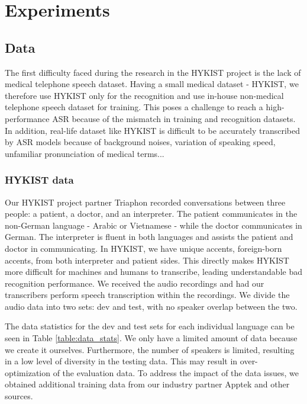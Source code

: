 \chapter{Experiments}
\label{ch: Experiments}


\section{Data}

The first difficulty faced during the research in the HYKIST project is the lack of medical telephone speech dataset.
Having a small medical dataset - HYKIST, we therefore use HYKIST only for the recognition and use in-house non-medical telephone speech dataset for training. 
This poses a challenge to reach a high-performance ASR because of the mismatch in training and recognition datasets.
In addition, real-life dataset like HYKIST is difficult to be accurately transcribed by ASR models because of background noises, variation of speaking speed, unfamiliar pronunciation of medical terms...


\subsection{HYKIST data}

Our HYKIST project partner Triaphon recorded conversations between three people: a patient, a doctor, and an interpreter. 
The patient communicates in the non-German language - Arabic or Vietnamese - while the doctor communicates in German. 
The interpreter is fluent in both languages and assists the patient and doctor in communicating. 
In HYKIST, we have unique accents, foreign-born accents, from both interpreter and patient sides.
This directly makes HYKIST more difficult for machines and humans to transcribe, leading understandable bad recognition performance.
We received the audio recordings and had our transcribers perform speech transcription within the recordings. 
We divide the audio data into two sets: dev and test, with no speaker overlap between the two.

The data statistics for the dev and test sets for each individual language can be seen in Table \ref{table:data_stats}.
We only have a limited amount of data because we create it ourselves.
Furthermore, the number of speakers is limited, resulting in a low level of diversity in the testing data.
This may result in over-optimization of the evaluation data.
To address the impact of the data issues, we obtained additional training data from our industry partner Apptek and other sources.

